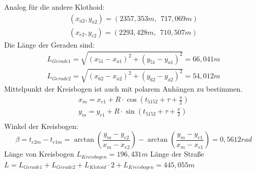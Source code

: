 \documentclass[12pt]{article}
\begin{document}
Analog für die andere Klothoid: 
\begin{gather*}
(x_{a2},y_{a2}) = (2357,353m, \ \ 717,069m) \\
(x_{e2},y_{e2}) = (2293,428m, \ \ 710,507m)
\end{gather*}
Die Länge der Geraden sind:
\begin{gather*}
L_{Gerade1} = \sqrt{(x_{51} - x_{a1})^2 + (y_{51} - y_{a1})^2} = 66,041m \\
L_{Gerade2} = \sqrt{(x_{62} - x_{a2})^2 + (y_{62} - y_{a2})^2} = 54,012m
\end{gather*}
Mittelpunkt der Kreisbogen ist auch mit polarem Anhängen zu bestimmen. 
\begin{gather*}
x_m = x_{e1} + R \cdot \cos (t_{5152} + \tau + \frac{\pi}{2}) \\
y_m = y_{e1} + R \cdot \sin (t_{5152} + \tau + \frac{\pi}{2}) \\
\end{gather*}
Winkel der Kreisbogen: 
\begin{equation*}
\beta = t_{e2m} - t_{e1m} = \arctan(\frac{y_m - y_{e2}}{x_m - x_{e2}}) - \arctan(\frac{y_m - y_{e1}}{x_m - x_{e1}}) = 0,5612 rad
\end{equation*}
Länge von Kreisbogen $L_{Kreisbogen} = 196,431m$\newline
Länge der Straße $L = L_{Gerade1} + L_{Gerade2} + L_{Klotoid} \cdot 2 + L_{Kreisbogen} = 445,055m$
\end{document}
